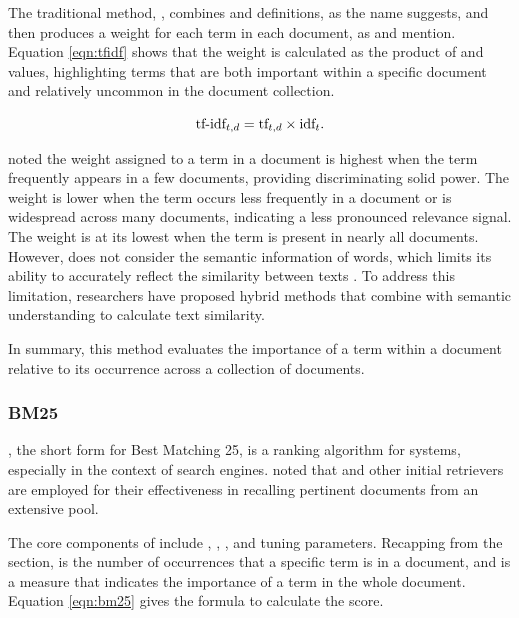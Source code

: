 The traditional {\ir} method, {\tfidf}, combines {\tf} and {\idf} definitions, as the name suggests, and then produces a weight for each term in each document, as \citet{manning_introduction_2009} and \cite{lan_research_2022} mention. Equation \ref{eqn:tfidf} shows that the weight is calculated as the product of {\tf} and {\idf} values, highlighting terms that are both important within a specific document and relatively uncommon in the document collection.

\begin{equation}
\textup{tf-idf}_{t,d} = \textup{tf}_{t,d} \times \textup{idf}_{t}.
\label{eqn:tfidf}
\end{equation}

\citet{manning_introduction_2009} noted the {\tfidf} weight assigned to a term in a document is highest when the term frequently appears in a few documents, providing discriminating solid power. The weight is lower when the term occurs less frequently in a document or is widespread across many documents, indicating a less pronounced relevance signal. The weight is at its lowest when the term is present in nearly all documents. However, {\tfidf} does not consider the semantic information of words, which limits its ability to accurately reflect the similarity between texts \cite{lan_research_2022}. To address this limitation, researchers have proposed hybrid methods that combine {\tfidf} with semantic understanding to calculate text similarity.

In summary, this {\ir} method evaluates the importance of a term within a document relative to its occurrence across a collection of documents.


\subsubsection{BM25}

{\bm}, the short form for Best Matching 25, is a ranking algorithm for {\ir} systems, especially in the context of search engines. \citet{hambarde_information_2023} noted that {\bm} and other initial retrievers are employed for their effectiveness in recalling pertinent documents from an extensive pool.

The core components of {\bm} include {\tf}, {\idf}, {\dl}, and tuning parameters. Recapping from the {\tfidf} section, {\tf} is the number of occurrences that a specific term is in a document, and {\idf} is a measure that indicates the importance of a term in the whole document. Equation \ref{eqn:bm25} gives the formula to calculate the {\bm} score.

